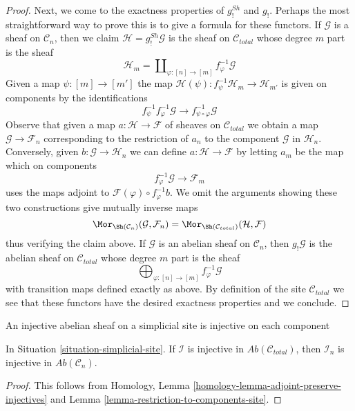 \begin{proof}
\medskip\noindent
Next, we come to the exactness properties of $g^{Sh}_!$ and $g_!$.
Perhaps the most straightforward way to prove this is to give a formula
for these functors. If $\mathcal{G}$ is a sheaf on $\mathcal{C}_n$,
then we claim $\mathcal{H} = g^{Sh}_!\mathcal{G}$ is the sheaf on
$\mathcal{C}_{total}$ whose degree $m$ part is the sheaf
$$
\mathcal{H}_m = \coprod\nolimits_{\varphi : [n] \to [m]}
f_\varphi^{-1}\mathcal{G}
$$
Given a map $\psi : [m] \to [m']$ the map
$\mathcal{H}(\psi) : f_\psi^{-1}\mathcal{H}_m \to \mathcal{H}_{m'}$
is given on components by the identifications
$$
f_\psi^{-1} f_\varphi^{-1} \mathcal{G} \to
f_{\psi \circ \varphi}^{-1}\mathcal{G}
$$
Observe that given a map $a : \mathcal{H} \to \mathcal{F}$ of sheaves on
$\mathcal{C}_{total}$ we obtain a map $\mathcal{G} \to \mathcal{F}_n$
corresponding to the restriction of $a_n$ to the component
$\mathcal{G}$ in $\mathcal{H}_n$. Conversely, given
$b : \mathcal{G} \to \mathcal{H}_n$ we can define
$a : \mathcal{H} \to \mathcal{F}$ by letting $a_m$ be the map which
on components
$$
f_\varphi^{-1}\mathcal{G} \to \mathcal{F}_m
$$
uses the maps adjoint to $\mathcal{F}(\varphi) \circ f_\varphi^{-1}b$.
We omit the arguments showing these two constructions give
mutually inverse maps
$$
\Mor_{\Sh(\mathcal{C}_n)}(\mathcal{G}, \mathcal{F}_n) =
\Mor_{\Sh(\mathcal{C}_{total})}(\mathcal{H}, \mathcal{F})
$$
thus verifying the claim above.
If $\mathcal{G}$ is an abelian sheaf on $\mathcal{C}_n$,
then $g_!\mathcal{G}$ is the abelian sheaf on $\mathcal{C}_{total}$
whose degree $m$ part is the sheaf
$$
\bigoplus\nolimits_{\varphi : [n] \to [m]} f_\varphi^{-1}\mathcal{G}
$$
with transition maps defined exactly as above. By definition of the
site $\mathcal{C}_{total}$ we see that these functors have the desired
exactness properties and we conclude.
\end{proof}

\begin{lemma}
\label{lemma-restriction-injective-to-component-site}
\begin{slogan}
An injective abelian sheaf on a simplicial site is injective on each component
\end{slogan}
In Situation \ref{situation-simplicial-site}.
If $\mathcal{I}$ is injective in $\textit{Ab}(\mathcal{C}_{total})$,
then $\mathcal{I}_n$ is injective in $\textit{Ab}(\mathcal{C}_n)$.
\end{lemma}

\begin{proof}
This follows from
Homology, Lemma \ref{homology-lemma-adjoint-preserve-injectives}
and
Lemma \ref{lemma-restriction-to-components-site}.
\end{proof}

